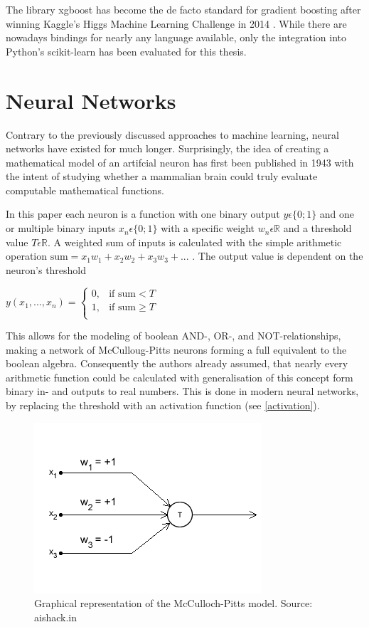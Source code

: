 The library xgboost \cite{DBLP:journals/corr/ChenG16} has become the de facto standard for gradient boosting after winning Kaggle's Higgs Machine Learning Challenge in 2014 \cite{xgboost-wins}. While there are nowadays bindings for nearly any language available, only the integration into Python's scikit-learn has been evaluated for this thesis.



\section{Neural Networks}

Contrary to the previously discussed approaches to machine learning, neural networks have existed for much longer. Surprisingly, the idea of creating a mathematical model of an artifcial neuron has first been published in 1943 \cite{McCulloch1943} with the intent of studying whether a mammalian brain could truly evaluate computable mathematical functions.

In this paper each neuron is a function with one binary output $y \epsilon \{0;1\}$ and one or multiple binary inputs $x_n \epsilon \{0;1\}$ with a specific weight $w_n \epsilon \mathbb{R}$ and a threshold value $T \epsilon \mathbb{R}$. A weighted sum of inputs is calculated with the simple arithmetic operation $\text{sum} = x_1w_1 + x_2w_2 + x_3w_3 + ...$ . The output value is dependent on the neuron's threshold

{\centering
	$y(x_1, ..., x_n) = \begin{cases}
    0,& \text{if } \text{sum} < T\\
    1,& \text{if } \text{sum} \geq T\\
	\end{cases}$
	\par
}

This allows for the modeling of boolean AND-, OR-, and NOT-relationships, making a network of McCulloug-Pitts neurons forming a full equivalent to the boolean algebra. Consequently the authors already assumed, that nearly every arithmetic function could be calculated with generalisation of this concept form binary in- and outputs to real numbers. This is done in modern neural networks, by replacing the threshold with an activation function (see \ref{activation}).


\begin{figure}[h]
    \centering
	\includegraphics[width=.6\textwidth]{./images/illustrations/mcculloch-pitts}
    \caption{Graphical representation of the McCulloch-Pitts model. Source: aishack.in}
    \label{fig:mcculloch-pitts}
\end{figure}


